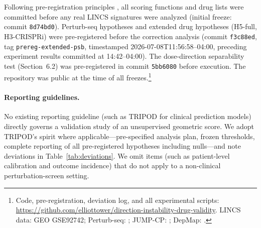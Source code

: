 \documentclass[11pt]{article}
\begin{document}
Following pre-registration principles \citep{nosek2018preregistration},
all scoring functions and drug lists were committed before any real LINCS
signatures were analyzed (initial freeze: commit \texttt{8d74bd0}).
Perturb-seq hypotheses and extended drug hypotheses (H5-full,
H3-CRISPRi) were pre-registered before the correction analysis
(commit \texttt{f3c88ed}, tag \texttt{prereg-extended-psb}, timestamped
2026-07-08T11:56:58--04:00, preceding experiment results committed at
14:42--04:00). The dose-direction separability test
(Section~6.2) was pre-registered in commit \texttt{5bb6080} before
execution. The repository was public at the time of all freezes.\footnote{Code, pre-registration, deviation log, and all
experimental scripts:
\url{https://github.com/elliottower/direction-instability-drug-validity}.
LINCS data: GEO GSE92742; Perturb-seq: \citet{replogle2022mapping};
JUMP-CP: \citet{chandrasekaran2023jump}; DepMap: \citet{dempster2021chronos}.}

\paragraph{Reporting guidelines.}
No existing reporting guideline (such as TRIPOD for clinical prediction models)
directly governs a validation study of an unsupervised geometric score.
We adopt TRIPOD's spirit where applicable---pre-specified analysis plan,
frozen thresholds, complete reporting of all pre-registered hypotheses
including nulls---and note deviations in Table~\ref{tab:deviations}.
We omit items (such as patient-level calibration and outcome incidence) that
do not apply to a non-clinical perturbation-screen setting.
\end{document}
